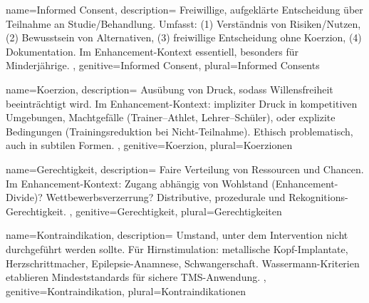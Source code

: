 {
	name=Informed Consent,
	description={
			Freiwillige, aufgeklärte Entscheidung über Teilnahme an Studie/Behandlung. Umfasst: (1) Verständnis von Risiken/Nutzen, (2) Bewusstsein von Alternativen, (3) freiwillige Entscheidung ohne Koerzion, (4) Dokumentation. Im Enhancement-Kontext essentiell, besonders für Minderjährige.
		},
	genitive=Informed Consent,
	plural=Informed Consents
}

{
	name=Koerzion,
	description={
			Ausübung von Druck, sodass Willensfreiheit beeinträchtigt wird. Im Enhancement-Kontext: impliziter Druck in kompetitiven Umgebungen, Machtgefälle (Trainer--Athlet, Lehrer--Schüler), oder explizite Bedingungen (Trainingsreduktion bei Nicht-Teilnahme). Ethisch problematisch, auch in subtilen Formen.
		},
	genitive=Koerzion,
	plural=Koerzionen
}

{
	name=Gerechtigkeit,
	description={
			Faire Verteilung von Ressourcen und Chancen. Im Enhancement-Kontext: Zugang abhängig von Wohlstand (Enhancement-Divide)? Wettbewerbsverzerrung? Distributive, prozedurale und Rekognitions-Gerechtigkeit.
		},
	genitive=Gerechtigkeit,
	plural=Gerechtigkeiten
}

{
	name=Kontraindikation,
	description={
			Umstand, unter dem Intervention nicht durchgeführt werden sollte. Für Hirnstimulation: metallische Kopf-Implantate, Herzschrittmacher, Epilepsie-Anamnese, Schwangerschaft. Wassermann-Kriterien etablieren Mindeststandards für sichere TMS-Anwendung. \cite{woods_technical_2016}
		},
	genitive=Kontraindikation,
	plural=Kontraindikationen
}

